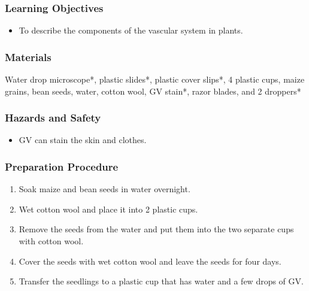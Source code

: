 \subsubsection*{Learning Objectives}
\begin{itemize}
\item{To describe the components of the vascular system in plants.}
\end{itemize}

\subsubsection*{Materials}
Water drop microscope*, plastic slides*, plastic cover slips*, 4 plastic cups, maize grains, bean seeds, water, cotton wool, GV stain*, razor blades, and 2 droppers*

\subsubsection*{Hazards and Safety}
\begin{itemize}
\item{GV can stain the skin and clothes.}
\end{itemize}

\subsubsection*{Preparation Procedure}
\begin{enumerate}
\item{Soak maize and bean seeds in water overnight.}
\item{Wet cotton wool and place it into 2 plastic cups.}
\item{Remove the seeds from the water and put them into the two separate cups with cotton wool.}
\item{Cover the seeds with wet cotton wool and leave the seeds for four days.}
\item{Transfer the seedlings to a plastic cup that has water and a few drops of GV.}
\end{enumerate}

